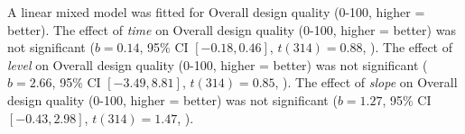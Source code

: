 A linear mixed model was fitted for Overall design quality (0-100, higher = better).
The effect of \textit{time} on Overall design quality (0-100, higher = better) was not significant ($b = 0.14$, 95\% CI $[-0.18, 0.46]$, $t(314) = 0.88$, ).
The effect of \textit{level} on Overall design quality (0-100, higher = better) was not significant ($b = 2.66$, 95\% CI $[-3.49, 8.81]$, $t(314) = 0.85$, ).
The effect of \textit{slope} on Overall design quality (0-100, higher = better) was not significant ($b = 1.27$, 95\% CI $[-0.43, 2.98]$, $t(314) = 1.47$, ).
